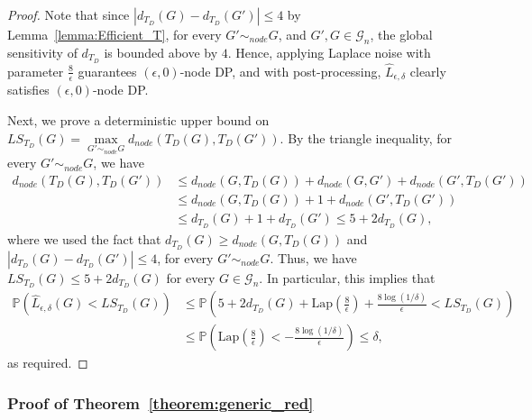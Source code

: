 \documentclass{article}
\begin{document}
\begin{proof}
Note that since $|d_{T_D}(G) - d_{T_D}(G')| \leq 4$ by Lemma~\ref{lemma:Efficient_T}, for every $G' \sim_{node} G$, and $G', G \in \mathcal{G}_n$, the global sensitivity of $d_{T_D}$ is bounded above by $4$. Hence, applying Laplace noise with parameter $\frac{8}{\epsilon}$ guarantees $(\epsilon, 0)$-node DP, and with post-processing, $\hat{L}_{\epsilon, \delta}$ clearly satisfies $(\epsilon, 0)$-node DP.

Next, we prove a deterministic upper bound on $LS_{T_D}(G) = \mathop{\max}\limits_{G' \sim_{node} G}d_{node}(T_D(G), T_D(G'))$. By the triangle inequality, for every $G' \sim_{node} G$, we have
\begin{align*}
d_{node}(T_D(G), T_D(G')) &\leq d_{node}(G, T_D(G)) + d_{node}(G, G') + d_{node}(G', T_D(G'))\\
&\leq d_{node}(G, T_D(G)) + 1 + d_{node}(G', T_D(G')) \\
%
& \leq d_{T_D}(G) + 1 + d_{T_D}(G') \leq 5 + 2d_{T_D}(G),
\end{align*}
where we used the fact that $d_{T_D}(G) \geq d_{node}(G, T_D(G))$ and $|d_{T_D}(G) - d_{T_D}(G')| \leq 4$, for every $G' \sim_{node} G$. Thus, we have $LS_{T_D}(G) \leq 5 + 2d_{T_D}(G)$ for every $G \in \mathcal{G}_n$. In particular, this implies that
\begin{align*}
\mathbb{P}(\hat{L}_{\epsilon, \delta}(G) < LS_{T_D}(G)) &\leq \mathbb{P}\left(5 + 2 d_{T_D}(G) + \mathrm{Lap}\left(\frac{8}{\epsilon}\right) + \frac{8 \log(1/\delta)}{\epsilon} < LS_{T_D}(G)\right)\\
&\leq  \mathbb{P}\left(\mathrm{Lap}\left(\frac{8}{\epsilon}\right) < -\frac{8\log(1/\delta)}{\epsilon}\right) \leq \delta,
\end{align*}
as required.
\end{proof}


\subsubsection{Proof of Theorem~\ref{theorem:generic_red}}
\label{AppThemGenRed}
\end{document}
